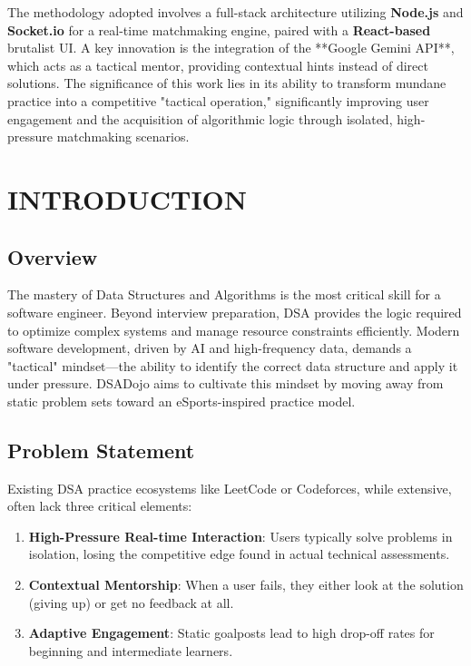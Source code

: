 \documentclass[12pt,a4paper]{report}
\begin{document}
The methodology adopted involves a full-stack architecture utilizing \textbf{Node.js} and \textbf{Socket.io} for a real-time matchmaking engine, paired with a \textbf{React-based} brutalist UI. A key innovation is the integration of the **Google Gemini API**, which acts as a tactical mentor, providing contextual hints instead of direct solutions. The significance of this work lies in its ability to transform mundane practice into a competitive "tactical operation," significantly improving user engagement and the acquisition of algorithmic logic through isolated, high-pressure matchmaking scenarios.

\vspace{20pt}
\listoftables
\vspace{20pt}
\listoffigures
\newpage
\tableofcontents

\newpage
{}

\chapter{INTRODUCTION}
\section{Overview}
The mastery of Data Structures and Algorithms is the most critical skill for a software engineer. Beyond interview preparation, DSA provides the logic required to optimize complex systems and manage resource constraints efficiently. Modern software development, driven by AI and high-frequency data, demands a "tactical" mindset—the ability to identify the correct data structure and apply it under pressure. DSADojo aims to cultivate this mindset by moving away from static problem sets toward an eSports-inspired practice model.

\section{Problem Statement}
Existing DSA practice ecosystems like LeetCode or Codeforces, while extensive, often lack three critical elements:
\begin{enumerate}
    \item \textbf{High-Pressure Real-time Interaction}: Users typically solve problems in isolation, losing the competitive edge found in actual technical assessments.
    \item \textbf{Contextual Mentorship}: When a user fails, they either look at the solution (giving up) or get no feedback at all.
    \item \textbf{Adaptive Engagement}: Static goalposts lead to high drop-off rates for beginning and intermediate learners.
\end{enumerate}
\end{document}
